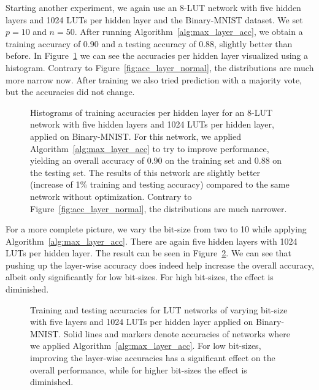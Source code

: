 \noindent Starting another experiment, we again use an 8-LUT network with five hidden layers and 1024 LUTs per hidden layer and the Binary-MNIST dataset. We set $p=10$ and $n=50$. After running Algorithm~\ref{alg:max_layer_acc}, we obtain a training accuracy of 0.90 and a testing accuracy of 0.88, slightly better than before. In Figure~\ref{fig:acc_layer_discard} we can see the accuracies per hidden layer visualized using a histogram. Contrary to Figure~\ref{fig:acc_layer_normal}, the distributions are much more narrow now. After training we also tried prediction with a majority vote, but the accuracies did not change.

\begin{figure}[!htb]
    \centering
    
    \caption{Histograms of training accuracies per hidden layer for an 8-LUT network with five hidden layers and 1024 LUTs per hidden layer, applied on Binary-MNIST. For this network, we applied Algorithm~\ref{alg:max_layer_acc} to try to improve performance, yielding an overall accuracy of 0.90 on the training set and 0.88 on the testing set. The results of this network are slightly better (increase of 1\% training and testing accuracy) compared to the same network without optimization. Contrary to Figure~\ref{fig:acc_layer_normal}, the distributions are much narrower.}
\label{fig:acc_layer_discard}
\end{figure}
\FloatBarrier

\noindent For a more complete picture, we vary the bit-size from two to 10 while applying Algorithm~\ref{alg:max_layer_acc}. There are again five hidden layers with 1024 LUTs per hidden layer. The result can be seen in Figure~\ref{fig:increase_layer_acc}. We can see that pushing up the layer-wise accuracy does indeed help increase the overall accuracy, albeit only significantly for low bit-sizes. For high bit-sizes, the effect is diminished.


\begin{figure}[!htb]
    \centering
    
    \caption{Training and testing accuracies for LUT networks of varying bit-size with five layers and 1024 LUTs per hidden layer applied on Binary-MNIST. Solid lines and markers denote accuracies of networks where we applied Algorithm~\ref{alg:max_layer_acc}. For low bit-sizes, improving the layer-wise accuracies has a significant effect on the overall performance, while for higher bit-sizes the effect is diminished.}
\label{fig:increase_layer_acc}
\end{figure}
\FloatBarrier

